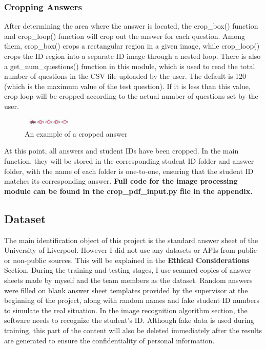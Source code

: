 \documentclass[twocolumn]{article}
\begin{document}
        \subsubsection{Cropping Answers}
        After determining the area where the answer is located, the crop\_box() function and crop\_loop() function will crop out the answer for each question. Among them, crop\_box() crops a rectangular region in a given image, while crop\_loop() crops the ID region into a separate ID image through a nested loop. There is also a get\_num\_questions() function in this module, which is used to read the total number of questions in the CSV file uploaded by the user. The default is 120 (which is the maximum value of the test question). If it is less than this value, crop loop will be cropped according to the actual number of questions set by the user.
        
        \begin{figure}[ht]
            \centering
            \includegraphics[width=0.2\textwidth]{ans.jpg}
            \caption{An example of a cropped answer}
            \label{fig:ans_example}
        \end{figure}
    
        At this point, all answers and student IDs have been cropped. In the main function, they will be stored in the corresponding student ID folder and answer folder, with the name of each folder is one-to-one, ensuring that the student ID matches its corresponding answer. \textbf{Full code for the image processing module can be found in the crop\_pdf\_input.py file in the appendix.}


    \subsection{Dataset}
    The main identification object of this project is the standard answer sheet of the University of Liverpool. However I did not use any datasets or APIs from public or non-public sources. This will be explained in the \textbf{Ethical Considerations} Section. During the training and testing stages, I use scanned copies of answer sheets made by myself and the team members as the dataset. Random answers were filled on blank answer sheet templates provided by the supervisor at the beginning of the project, along with random names and fake student ID numbers to simulate the real situation. In the image recognition algorithm section, the software needs to recognize the student's ID. Although fake data is used during training, this part of the content will also be deleted immediately after the results are generated to ensure the confidentiality of personal information.
\end{document}
